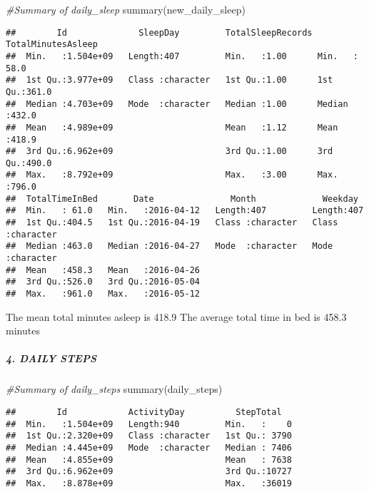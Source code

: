 \documentclass[
]{article}
\newenvironment{Shaded}{\begin{snugshade}}{\end{snugshade}}
\newcommand{\CommentTok}[1]{\textcolor[rgb]{0.56,0.35,0.01}{\textit{#1}}}
\newcommand{\FunctionTok}[1]{\textcolor[rgb]{0.00,0.00,0.00}{#1}}
\newcommand{\NormalTok}[1]{#1}
\begin{document}
\begin{Shaded}
\begin{Highlighting}[]
\CommentTok{\#Summary of daily\_sleep}
\FunctionTok{summary}\NormalTok{(new\_daily\_sleep)}
\end{Highlighting}
\end{Shaded}

\begin{verbatim}
##        Id              SleepDay         TotalSleepRecords TotalMinutesAsleep
##  Min.   :1.504e+09   Length:407         Min.   :1.00      Min.   : 58.0     
##  1st Qu.:3.977e+09   Class :character   1st Qu.:1.00      1st Qu.:361.0     
##  Median :4.703e+09   Mode  :character   Median :1.00      Median :432.0     
##  Mean   :4.989e+09                      Mean   :1.12      Mean   :418.9     
##  3rd Qu.:6.962e+09                      3rd Qu.:1.00      3rd Qu.:490.0     
##  Max.   :8.792e+09                      Max.   :3.00      Max.   :796.0     
##  TotalTimeInBed       Date               Month             Weekday         
##  Min.   : 61.0   Min.   :2016-04-12   Length:407         Length:407        
##  1st Qu.:404.5   1st Qu.:2016-04-19   Class :character   Class :character  
##  Median :463.0   Median :2016-04-27   Mode  :character   Mode  :character  
##  Mean   :458.3   Mean   :2016-04-26                                        
##  3rd Qu.:526.0   3rd Qu.:2016-05-04                                        
##  Max.   :961.0   Max.   :2016-05-12
\end{verbatim}

The mean total minutes asleep is 418.9 The average total time in bed is
458.3 minutes

\hypertarget{daily-steps}{%
\subparagraph{4. DAILY STEPS}\label{daily-steps}}

\begin{Shaded}
\begin{Highlighting}[]
\CommentTok{\#Summary of daily\_steps}
\FunctionTok{summary}\NormalTok{(daily\_steps)}
\end{Highlighting}
\end{Shaded}

\begin{verbatim}
##        Id            ActivityDay          StepTotal    
##  Min.   :1.504e+09   Length:940         Min.   :    0  
##  1st Qu.:2.320e+09   Class :character   1st Qu.: 3790  
##  Median :4.445e+09   Mode  :character   Median : 7406  
##  Mean   :4.855e+09                      Mean   : 7638  
##  3rd Qu.:6.962e+09                      3rd Qu.:10727  
##  Max.   :8.878e+09                      Max.   :36019
\end{verbatim}
\end{document}
